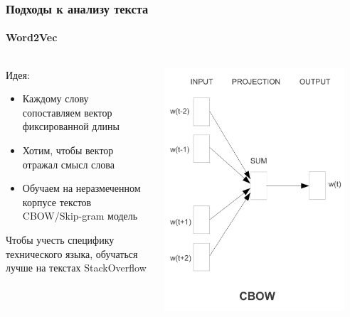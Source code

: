 \documentclass[10pt]{beamer}
\begin{document}
\begin{frame}
\frametitle{Подходы к анализу текста}
\framesubtitle{Word2Vec}

\begin{columns}
    \begin{column}{0.5\textwidth}
    	Идея:
    	\begin{itemize}
        	\item Каждому слову сопоставляем вектор фиксированной длины
        	\item Хотим, чтобы вектор отражал смысл слова
        	\item Обучаем на неразмеченном корпусе текстов CBOW/Skip-gram модель        
        \end{itemize}

        Чтобы учесть специфику технического языка, обучаться лучше на текстах StackOverflow
    \end{column}
    \begin{column}{0.5\textwidth}
        \begin{center}
            \includegraphics[width=0.9\textwidth]{images/cbow.png} 
        \end{center}
    \end{column}
\end{columns}
\end{frame}
\end{document}
